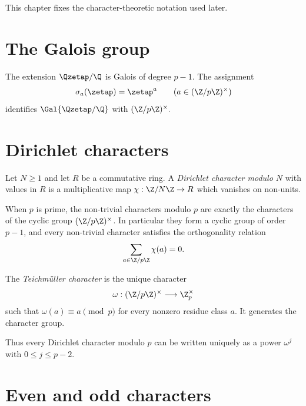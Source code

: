 This chapter fixes the character-theoretic notation used later.

\section{The Galois group}

\begin{definition}\label{def:galois-cyclotomic}
  \leanok
The extension $\Qzetap/\Q$ is Galois of degree $p-1$. The assignment
\[
  \sigma_a(\zetap)=\zetap^a
  \qquad (a\in (\Z/p\Z)^\times)
\]
identifies
\(
  \Gal{\Qzetap/\Q}
\)
with
\(
  (\Z/p\Z)^\times.
\)
\end{definition}

\section{Dirichlet characters}

\begin{definition}\label{def:dirichlet-character}
  \leanok
Let $N\ge 1$ and let $R$ be a commutative ring. A \emph{Dirichlet character
modulo $N$} with values in $R$ is a multiplicative map
\(
  \chi : \Z/N\Z \to R
\)
which vanishes on non-units.
\end{definition}

When $p$ is prime, the non-trivial characters modulo $p$ are exactly the
characters of the cyclic group $(\Z/p\Z)^\times$. In particular they form a
cyclic group of order $p-1$, and every non-trivial character satisfies the
orthogonality relation
\[
  \sum_{a\in \Z/p\Z} \chi(a) = 0.
\]

\begin{definition}
  \label{def:teichmuller}
  \leanok
The \emph{Teichm\"uller character} is the unique character
\[
  \omega : (\Z/p\Z)^\times \longrightarrow \Z_p^\times
\]
such that \(\omega(a)\equiv a\pmod p\) for every nonzero residue class
\(a\). It generates the character group.
\end{definition}

Thus every Dirichlet character modulo $p$ can be written uniquely as a power
\(\omega^j\) with $0\le j\le p-2$.

\section{Even and odd characters}

